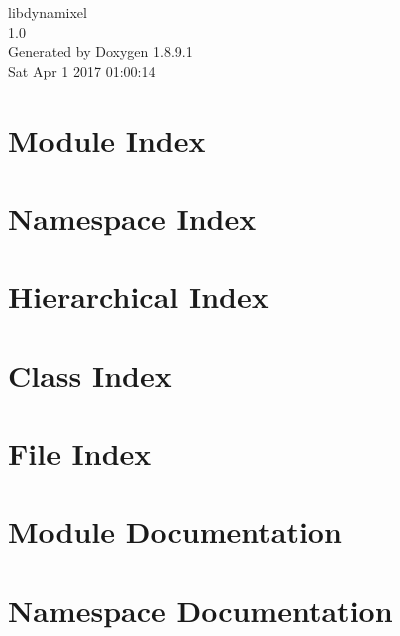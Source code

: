 \documentclass[twoside]{book}
\newcommand{\+}{\discretionary{\mbox{\scriptsize$\hookleftarrow$}}{}{}}
\newcommand{\clearemptydoublepage}{%
  \newpage{\pagestyle{empty}\cleardoublepage}%
}
\begin{document}
\hypersetup{pageanchor=false,
             bookmarks=true,
             bookmarksnumbered=true,
             pdfencoding=unicode
            }
\begin{titlepage}
\vspace*{7cm}
\begin{center}%
{\Large libdynamixel \\[1ex]\large 1.\+0 }\\
\vspace*{1cm}
{\large Generated by Doxygen 1.8.9.1}\\
\vspace*{0.5cm}
{\small Sat Apr 1 2017 01:00:14}\\
\end{center}
\end{titlepage}
\clearemptydoublepage
\tableofcontents
\clearemptydoublepage
{}
\hypersetup{pageanchor=true}

\chapter{Module Index}

\chapter{Namespace Index}

\chapter{Hierarchical Index}

\chapter{Class Index}

\chapter{File Index}

\chapter{Module Documentation}


\chapter{Namespace Documentation}







\end{document}
